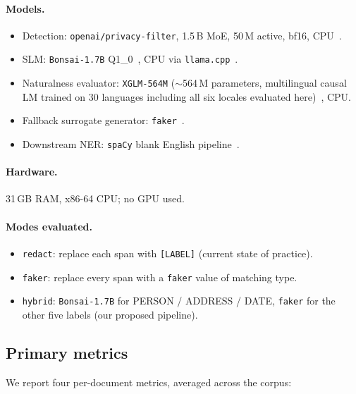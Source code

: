 \documentclass[11pt]{article}
\newcommand{\code}[1]{\texttt{#1}}
\newcommand{\openaipf}{\code{openai/privacy-filter}}
\newcommand{\bonsai}{\code{Bonsai-1.7B}}
\newcommand{\faker}{\code{faker}}
\newcommand{\spacy}{\code{spaCy}}
\newcommand{\xglm}{\code{XGLM-564M}}
\begin{document}
\paragraph{Models.}
\begin{itemize}[leftmargin=*, itemsep=2pt, topsep=2pt]
  \item Detection: \openaipf{}, 1.5\,B MoE, 50\,M active, bf16,
        CPU~\cite{privacyfilter,transformers}.
  \item SLM: \bonsai{} Q1\_0~\cite{bonsai}, CPU via
        \code{llama.cpp}~\cite{llamacpp}.
  \item Naturalness evaluator: \xglm{} ($\sim$564\,M parameters,
        multilingual causal LM trained on 30 languages including all
        six locales evaluated here)~\cite{xglm}, CPU.
  \item Fallback surrogate generator: \faker{}~\cite{faker}.
  \item Downstream NER: \spacy{} blank English pipeline~\cite{spacy}.
\end{itemize}

\paragraph{Hardware.}
31\,GB RAM, x86-64 CPU; no GPU used.

\paragraph{Modes evaluated.}
\begin{itemize}[leftmargin=*, itemsep=2pt, topsep=2pt]
  \item \texttt{redact}: replace each span with \code{[LABEL]} (current
        state of practice).
  \item \texttt{faker}: replace every span with a \faker{} value of
        matching type.
  \item \texttt{hybrid}: \bonsai{} for PERSON / ADDRESS / DATE,
        \faker{} for the other five labels (our proposed pipeline).
\end{itemize}

\subsection{Primary metrics}
\label{sec:primary}

We report four per-document metrics, averaged across the corpus:
\end{document}
